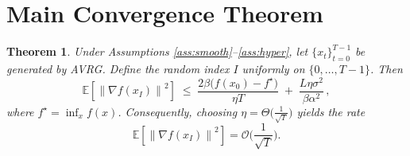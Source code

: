 \documentclass{article}
\newtheorem{theorem}{Theorem}
\newcommand{\E}{\mathbb{E}}
\newcommand{\norm}[1]{\left\lVert#1\right\rVert}
\begin{document}
\section*{Main Convergence Theorem}
\begin{theorem}\label{thm:main}
Under Assumptions \ref{ass:smooth}–\ref{ass:hyper}, let $\{x_t\}_{t=0}^{T-1}$ be generated by AVRG. Define the random index $I$ uniformly on $\{0,\dots,T-1\}$. Then
\[
\E\!\left[\norm{\nabla f(x_I)}^2\right]\;\le\;
\frac{2\beta\big(f(x_0)-f^\star\big)}{\eta T}
\;+\;
\frac{L\eta\sigma^{2}}{\beta\alpha^{2}}\,,
\tag{1}
\]
where $f^\star=\inf_x f(x)$. Consequently, choosing $\eta =\Theta\!\big(\frac{1}{\sqrt{T}}\big)$ yields the rate
\[
\E\!\left[\norm{\nabla f(x_I)}^2\right]=\mathcal{O}\!\Big(\frac{1}{\sqrt{T}}\Big).
\]
\end{theorem}
\end{document}
